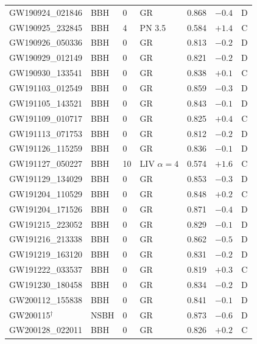 \documentclass[11pt,a4paper, english]{book}
\theoremstyle{plain}
\theoremstyle{definition}
\numberwithin{equation}{chapter}
\numberwithin{figure}{chapter}
\numberwithin{table}{chapter}
\begin{document}
\begin{landscape}
{\begin{longtable}{@{}p{4.5cm}p{0.9cm}p{1.5cm}p{2.8cm}ccc@{}}
GW190924\_021846           & BBH  & 0  & GR             & 0.868 & $-0.4$ & D \\
GW190925\_232845           & BBH  & 4  & PN 3.5         & 0.584 & $+1.4$ & C \\
GW190926\_050336           & BBH  & 0  & GR             & 0.813 & $-0.2$ & D \\
GW190929\_012149           & BBH  & 0  & GR             & 0.821 & $-0.2$ & D \\
GW190930\_133541           & BBH  & 0  & GR             & 0.838 & $+0.1$ & C \\
GW191103\_012549           & BBH  & 0  & GR             & 0.859 & $-0.3$ & D \\
GW191105\_143521           & BBH  & 0  & GR             & 0.843 & $-0.1$ & D \\
GW191109\_010717           & BBH  & 0  & GR             & 0.825 & $+0.4$ & C \\
GW191113\_071753           & BBH  & 0  & GR             & 0.812 & $-0.2$ & D \\
GW191126\_115259           & BBH  & 0  & GR             & 0.836 & $-0.1$ & D \\
GW191127\_050227           & BBH  & 10 & LIV $\alpha{=}4$ & 0.574 & $+1.6$ & C \\
GW191129\_134029           & BBH  & 0  & GR             & 0.853 & $-0.3$ & D \\
GW191204\_110529           & BBH  & 0  & GR             & 0.848 & $+0.2$ & C \\
GW191204\_171526           & BBH  & 0  & GR             & 0.871 & $-0.4$ & D \\
GW191215\_223052           & BBH  & 0  & GR             & 0.829 & $-0.1$ & D \\
GW191216\_213338           & BBH  & 0  & GR             & 0.862 & $-0.5$ & D \\
GW191219\_163120           & BBH  & 0  & GR             & 0.831 & $-0.2$ & D \\
GW191222\_033537           & BBH  & 0  & GR             & 0.819 & $+0.3$ & C \\
GW191230\_180458           & BBH  & 0  & GR             & 0.834 & $-0.2$ & D \\
GW200112\_155838           & BBH  & 0  & GR             & 0.841 & $-0.1$ & D \\
GW200115$^\dagger$ & NSBH & 0  & GR             & 0.873 & $-0.6$ & D \\
GW200128\_022011           & BBH  & 0  & GR             & 0.826 & $+0.2$ & C \\

\end{longtable}}
\end{landscape}
\end{document}
